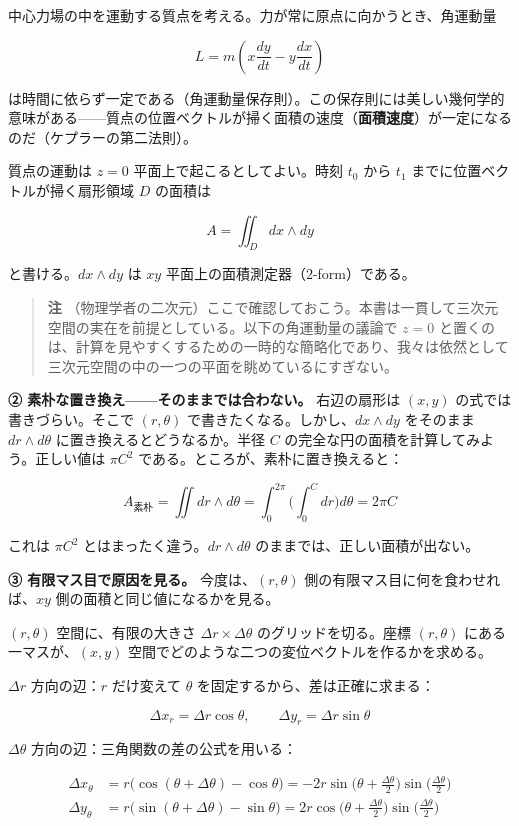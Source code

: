 \documentclass[a4paper,12pt,openany]{book}
\begin{document}
中心力場の中を運動する質点を考える。力が常に原点に向かうとき、角運動量

\[
L
=
m\left(
x\frac{dy}{dt}
-
y\frac{dx}{dt}
\right)
\]

は時間に依らず一定である（角運動量保存則）。この保存則には美しい幾何学的意味がある——質点の位置ベクトルが掃く面積の速度（\textbf{面積速度}）が一定になるのだ（ケプラーの第二法則）。

質点の運動は \(z=0\) 平面上で起こるとしてよい。時刻 \(t_0\) から \(t_1\)
までに位置ベクトルが掃く扇形領域 \(D\) の面積は

\[A = \iint_D dx \wedge dy\]

と書ける。\(dx \wedge dy\) は \(xy\)
平面上の面積測定器（\(2\)-form）である。

\begin{quote}
\textbf{注}
（物理学者の二次元）ここで確認しておこう。本書は一貫して三次元空間の実在を前提としている。以下の角運動量の議論で
\(z=0\)
と置くのは、計算を見やすくするための一時的な簡略化であり、我々は依然として三次元空間の中の一つの平面を眺めているにすぎない。
\end{quote}

\textbf{② 素朴な置き換え——そのままでは合わない。} 右辺の扇形は \((x,y)\)
の式では書きづらい。そこで \((r,\theta)\)
で書きたくなる。しかし、\(dx \wedge dy\) をそのまま
\(dr \wedge d\theta\) に置き換えるとどうなるか。半径 \(C\)
の完全な円の面積を計算してみよう。正しい値は \(\pi C^2\)
である。ところが、素朴に置き換えると：

\[
A_{\text{素朴}}
=
\iint dr \wedge d\theta
=
\int_0^{2\pi}
\biggl(
  \int_0^C dr
\biggr)
d\theta
=
2\pi C
\]

これは \(\pi C^2\) とはまったく違う。\(dr \wedge d\theta\)
のままでは、正しい面積が出ない。

\textbf{③ 有限マス目で原因を見る。} 今度は、\((r,\theta)\)
側の有限マス目に何を食わせれば、\(xy\) 側の面積と同じ値になるかを見る。

\((r,\theta)\) 空間に、有限の大きさ \(\Delta r \times \Delta\theta\)
のグリッドを切る。座標 \((r, \theta)\) にある一マスが、\((x,y)\)
空間でどのような二つの変位ベクトルを作るかを求める。

\(\Delta r\) 方向の辺：\(r\) だけ変えて \(\theta\)
を固定するから、差は正確に求まる：

\[\Delta x_r = \Delta r \cos\theta,\qquad \Delta y_r = \Delta r \sin\theta\]

\(\Delta\theta\) 方向の辺：三角関数の差の公式を用いる：

\[\begin{aligned}
\Delta x_\theta &= r\bigl(\cos(\theta+\Delta\theta) - \cos\theta\bigr)
= -2r\sin\biggl(\theta+\frac{\Delta\theta}{2}\biggr)\sin\biggl(\frac{\Delta\theta}{2}\biggr) \\[4pt]
\Delta y_\theta &= r\bigl(\sin(\theta+\Delta\theta) - \sin\theta\bigr)
= 2r\cos\biggl(\theta+\frac{\Delta\theta}{2}\biggr)\sin\biggl(\frac{\Delta\theta}{2}\biggr)
\end{aligned}\]
\end{document}
